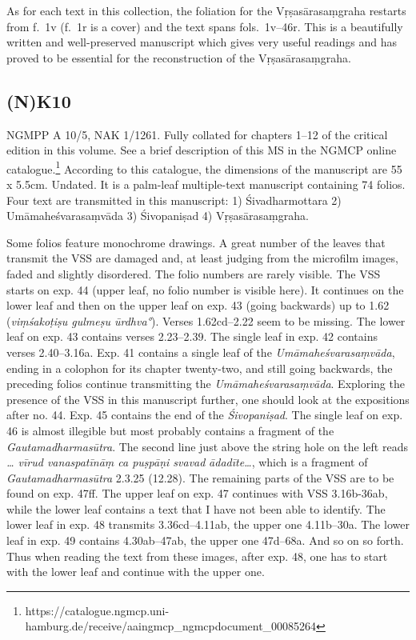 \documentclass[]{article}
\begin{document}
As for each text in this collection, the foliation for the
Vṛṣasārasaṃgraha restarts from f.~1v (f.~1r is a cover) and the text
spans fols.~1v--46r. This is a beautifully written and well-preserved
manuscript which gives very useful readings and has proved to be
essential for the reconstruction of the Vṛṣasārasaṃgraha.

\hypertarget{nk10}{%
\subsection{(N)K10}\label{nk10}}

NGMPP A 10/5, NAK 1/1261. Fully collated for chapters 1--12 of the
critical edition in this volume. See a brief description of this MS in
the NGMCP online catalogue.\footnote{https://catalogue.ngmcp.uni-hamburg.de/receive/aaingmcp\_ngmcpdocument\_00085264}
According to this catalogue, the dimensions of the manuscript are 55 x
5.5cm. Undated. It is a palm-leaf multiple-text manuscript containing 74
folios. Four text are transmitted in this manuscript: 1) Śivadharmottara
2) Umāmaheśvarasaṃvāda 3) Śivopaniṣad 4) Vṛṣasārasaṃgraha.

Some folios feature monochrome drawings. A great number of the leaves
that transmit the VSS are damaged and, at least judging from the
microfilm images, faded and slightly disordered. The folio numbers are
rarely visible. The VSS starts on exp. 44 (upper leaf, no folio number
is visible here). It continues on the lower leaf and then on the upper
leaf on exp. 43 (going backwards) up to 1.62 (\emph{viṃśakoṭiṣu gulmeṣu
ūrdhva°}). Verses 1.62cd--2.22 seem to be missing. The lower leaf on
exp. 43 contains verses 2.23--2.39. The single leaf in exp. 42 contains
verses 2.40--3.16a. Exp. 41 contains a single leaf of the
\emph{Umāmaheśvarasaṃvāda}, ending in a colophon for its chapter
twenty-two, and still going backwards, the preceding folios continue
transmitting the \emph{Umāmaheśvarasaṃvāda}. Exploring the presence of
the VSS in this manuscript further, one should look at the expositions
after no. 44. Exp. 45 contains the end of the \emph{Śivopaniṣad}. The
single leaf on exp. 46 is almost illegible but most probably contains a
fragment of the \emph{Gautamadharmasūtra}. The second line just above
the string hole on the left reads \emph{\ldots{} vīrud vanaspatīnāṃ ca
puṣpāṇi svavad} \emph{ādadīte\ldots{}}, which is a fragment of
\emph{Gautamadharmasūtra} 2.3.25 (12.28). The remaining parts of the VSS
are to be found on exp. 47ff. The upper leaf on exp. 47 continues with
VSS 3.16b-36ab, while the lower leaf contains a text that I have not
been able to identify. The lower leaf in exp. 48 transmits
3.36cd--4.11ab, the upper one 4.11b--30a. The lower leaf in exp. 49
contains 4.30ab--47ab, the upper one 47d--68a. And so on so forth. Thus
when reading the text from these images, after exp. 48, one has to start
with the lower leaf and continue with the upper one.
\end{document}
